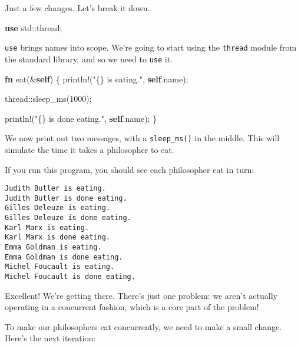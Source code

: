 \documentclass[a4paper,]{book}
\newenvironment{Shaded}{\begin{snugshade}}{\end{snugshade}}
\newcommand{\KeywordTok}[1]{\textcolor[rgb]{0.13,0.29,0.53}{\textbf{{#1}}}}
\newcommand{\DecValTok}[1]{\textcolor[rgb]{0.00,0.00,0.81}{{#1}}}
\newcommand{\StringTok}[1]{\textcolor[rgb]{0.31,0.60,0.02}{{#1}}}
\newcommand{\OtherTok}[1]{\textcolor[rgb]{0.56,0.35,0.01}{{#1}}}
\newcommand{\NormalTok}[1]{{#1}}
\begin{document}
Just a few changes. Let's break it down.

\begin{Shaded}
\begin{Highlighting}[]
\KeywordTok{use} \NormalTok{std::thread;}
\end{Highlighting}
\end{Shaded}

\texttt{use} brings names into scope. We're going to start using the
\texttt{thread} module from the standard library, and so we need to
\texttt{use} it.

\begin{Shaded}
\begin{Highlighting}[]
    \KeywordTok{fn} \NormalTok{eat(&}\KeywordTok{self}\NormalTok{) \{}
        \OtherTok{println!}\NormalTok{(}\StringTok{"\{\} is eating."}\NormalTok{, }\KeywordTok{self}\NormalTok{.name);}

        \NormalTok{thread::sleep_ms(}\DecValTok{1000}\NormalTok{);}

        \OtherTok{println!}\NormalTok{(}\StringTok{"\{\} is done eating."}\NormalTok{, }\KeywordTok{self}\NormalTok{.name);}
    \NormalTok{\}}
\end{Highlighting}
\end{Shaded}

We now print out two messages, with a \texttt{sleep\_ms()} in the
middle. This will simulate the time it takes a philosopher to eat.

If you run this program, you should see each philosopher eat in turn:

\begin{verbatim}
Judith Butler is eating.
Judith Butler is done eating.
Gilles Deleuze is eating.
Gilles Deleuze is done eating.
Karl Marx is eating.
Karl Marx is done eating.
Emma Goldman is eating.
Emma Goldman is done eating.
Michel Foucault is eating.
Michel Foucault is done eating.
\end{verbatim}

Excellent! We're getting there. There's just one problem: we aren't
actually operating in a concurrent fashion, which is a core part of the
problem!

To make our philosophers eat concurrently, we need to make a small
change. Here's the next iteration:
\end{document}
